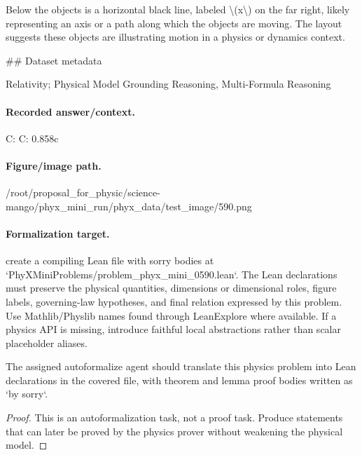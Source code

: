 Below the objects is a horizontal black line, labeled \textbackslash{}(x\textbackslash{}) on the far right, likely representing an axis or a path along which the objects are moving. The layout suggests these objects are illustrating motion in a physics or dynamics context.

\#\# Dataset metadata

Relativity; Physical Model Grounding Reasoning, Multi-Formula Reasoning

\paragraph{Recorded answer/context.}
C: C: 0.858c

\paragraph{Figure/image path.}
/root/proposal\_for\_physic/science-mango/phyx\_mini\_run/phyx\_data/test\_image/590.png

\paragraph{Formalization target.}
create a compiling Lean file with sorry bodies at `PhyXMiniProblems/problem\_phyx\_mini\_0590.lean`. The Lean declarations must preserve the physical quantities, dimensions or dimensional roles, figure labels, governing-law hypotheses, and final relation expressed by this problem.
Use Mathlib/Physlib names found through LeanExplore where available. If a physics API is missing, introduce faithful local abstractions rather than scalar placeholder aliases.

\begin{theorem}
\label{thm:physics:phyx_mini_0590:target}
The assigned autoformalize agent should translate this physics problem into Lean declarations in the covered file, with theorem and lemma proof bodies written as `by sorry`.
\end{theorem}
\begin{proof}
This is an autoformalization task, not a proof task. Produce statements that can later be proved by the physics prover without weakening the physical model.
\end{proof}

